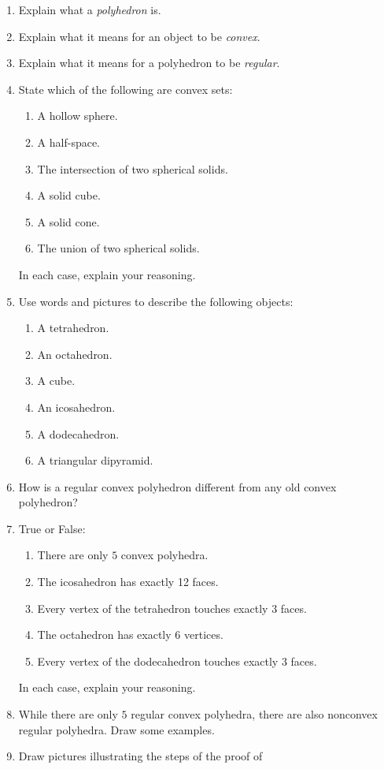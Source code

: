 \problems
\begin{enumerate}
\item Explain what a \textit{polyhedron} is.
\item Explain what it means for an object to be \textit{convex}.
\item Explain what it means for a polyhedron to be \textit{regular}.
\item State which of the following are convex sets:
\begin{enumerate}
\item A hollow sphere.
\item A half-space.
\item The intersection of two spherical solids.
\item A solid cube.
\item A solid cone.
\item The union of two spherical solids.
\end{enumerate}
In each case, explain your reasoning.
\item Use words and pictures to describe the following objects:
\begin{enumerate}
\item A tetrahedron.
\item An octahedron.
\item A cube.
\item An icosahedron.
\item A dodecahedron.
\item A triangular dipyramid.
\end{enumerate}
\item How is a regular convex polyhedron different from any old convex
  polyhedron?
\item True or False: 
\begin{enumerate}
\item There are only $5$ convex polyhedra.
\item The icosahedron has exactly 12 faces.
\item Every vertex of the tetrahedron touches exactly $3$ faces.
\item The octahedron has exactly $6$ vertices.
\item Every vertex of the dodecahedron touches exactly $3$ faces.
\end{enumerate}
In each case, explain your reasoning.
\item While there are only $5$ regular convex polyhedra, there are
  also nonconvex regular polyhedra. Draw some examples.
\item Draw pictures illustrating the steps of the proof of

\end{enumerate}
